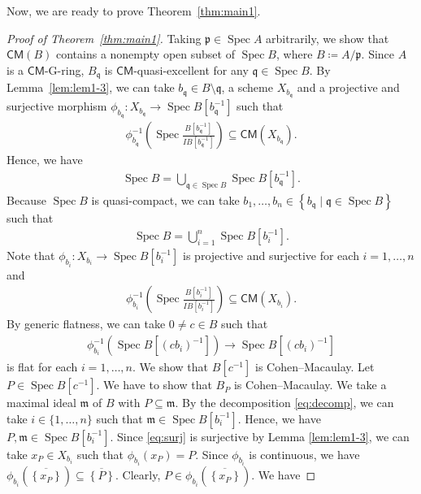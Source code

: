 \documentclass[a4paper, 11pt]{amsart}
\theoremstyle{definition}
\newcommand{\Spec}{\operatorname{Spec}}
\let\subset\subseteq
\begin{document}
Now, we are ready to prove Theorem~\ref{thm:main1}.

\begin{proof}[Proof of Theorem~\ref{thm:main1}]
    Taking $\mathfrak{p} \in \Spec A$ arbitrarily, we show that $\mathsf{CM}(B)$ contains a nonempty open subset of $\Spec B$, where $B \coloneqq A/\mathfrak{p}$. Since $A$ is a $\mathsf{CM}$\textnormal{-G-}ring, $B_\mathfrak{q}$ is $\mathsf{CM}$-quasi-excellent for any $\mathfrak{q} \in \Spec B$. By Lemma~\ref{lem:lem1-3}, we can take $b_{\mathfrak{q}} \in B \setminus \mathfrak{q}$, a scheme $X_{b_{\mathfrak{q}}}$ and a projective and surjective morphism $\phi_{b_{\mathfrak{q}}} \colon X_{b_{\mathfrak{q}}} \to \Spec B[b_{\mathfrak{q}}^{-1}]$ such that
    \begin{align*}
        \phi_{b_{\mathfrak{q}}}^{-1}\left( \Spec \frac{B[b_{\mathfrak{q}}^{-1}]}{IB[b_{\mathfrak{q}}^{-1}]} \right) \subset \mathsf{CM}(X_{b_{\mathfrak{q}}}). 
    \end{align*}
    Hence, we have
    \begin{align*}
        \Spec B = \bigcup_{\mathfrak{q} \in \Spec B} \Spec B[b_{\mathfrak{q}}^{-1}].
    \end{align*}
    Because $\Spec B$ is quasi-compact, we can take $b_1, \ldots, b_n \in \left\{ b_{\mathfrak{q}} \mid \mathfrak{q} \in \Spec B \right\}$ such that
    \begin{align}\label{eq:decomp}
        \Spec B = \bigcup_{i=1}^n \Spec B[b_i^{-1}].
    \end{align}
    Note that $\phi_{b_i} \colon X_{b_i} \to \Spec B[b_i^{-1}]$ is projective and surjective for each $i = 1, \ldots, n$ and 
    \begin{align*}
        \phi_{b_i}^{-1}\left( \Spec \frac{B[b_i^{-1}]}{IB[b_i^{-1}]} \right) \subset \mathsf{CM}(X_{b_i}). 
    \end{align*}
    By generic flatness, we can take $0 \neq c \in B$ such that 
    \begin{align}\label{eq:surj}
        \phi_{b_i}^{-1}\left( \Spec B[(cb_i)^{-1}] \right) \to \Spec B[(cb_i)^{-1}]
    \end{align}
    is flat for each $i = 1, \ldots, n$. We show that $B[c^{-1}]$ is Cohen--Macaulay. Let $P \in \Spec B[c^{-1}]$. We have to show that $B_P$ is Cohen--Macaulay. We take a maximal ideal $\mathfrak{m}$ of $B$ with $P \subset \mathfrak{m}$. By the decomposition \eqref{eq:decomp}, we can take $i \in \{ 1, \ldots, n \}$ such that $\mathfrak{m} \in \Spec B[b_i^{-1}]$. Hence, we have $P, \mathfrak{m} \in \Spec B[b_i^{-1}]$. Since \eqref{eq:surj} is surjective by Lemma \ref{lem:lem1-3}, we can take $x_P \in X_{b_i}$ such that $\phi_{b_i}(x_P) = P$. Since $\phi_{b_i}$ is continuous, we have $\phi_{b_i}(\overline{\left\{ x_P \right\}}) \subset \overline{\left\{ P \right\}}$. Clearly, $P \in \phi_{b_i}(\overline{\left\{ x_P \right\}})$. We have

\end{proof}
\end{document}
